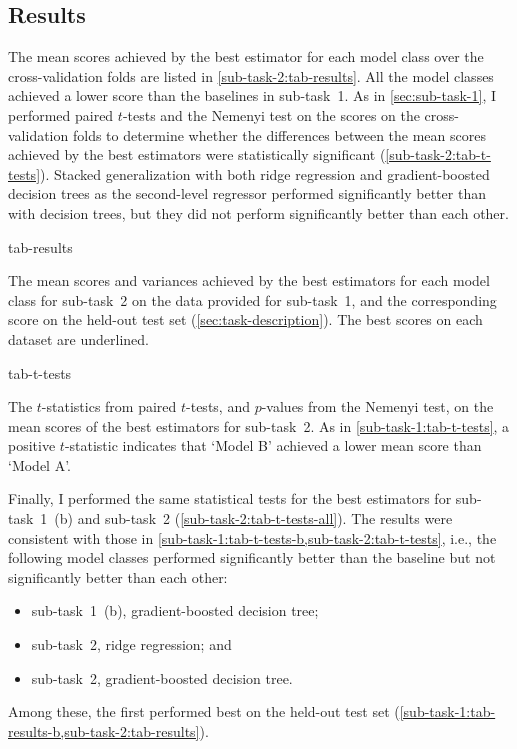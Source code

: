 \subsection{Results}
\label{sec:sub-task-2:results}

The mean scores achieved by the best estimator for each model class over the
cross-validation folds are listed in \cref{sub-task-2:tab-results}.
All the model classes achieved a lower score than the baselines in sub-task~1.
As in \cref{sec:sub-task-1}, I performed paired $t$-tests and the Nemenyi test on the
scores on the cross-validation folds to determine whether the differences between the
mean scores achieved by the best estimators were statistically significant
(\cref{sub-task-2:tab-t-tests}).
Stacked generalization with both ridge regression and gradient-boosted decision trees
as the second-level regressor performed significantly better than with decision trees,
but they did not perform significantly better than each other.

\begin{table}
  \centering
  {tab-results}
  \caption{
    The mean scores and variances achieved by the best estimators for each model class
    for sub-task~2 on the data provided for sub-task~1, and the corresponding score on
    the held-out test set (\cref{sec:task-description}).
    The best scores on each dataset are underlined.
  }
  \label{sub-task-2:tab-results}
\end{table}

\begin{table}
  \centering
  {tab-t-tests}
  \caption{
    The $t$-statistics from paired $t$-tests, and $p$-values from the Nemenyi test, on
    the mean scores of the best estimators for sub-task~2.
    As in \cref{sub-task-1:tab-t-tests}, a positive $t$-statistic indicates that `Model B'
    achieved a lower mean score than `Model A'.
  }
  \label{sub-task-2:tab-t-tests}
\end{table}

Finally, I performed the same statistical tests for the best estimators for
sub-task~1~(b) and sub-task~2 (\cref{sub-task-2:tab-t-tests-all}).
The results were consistent with those in
\cref{sub-task-1:tab-t-tests-b,sub-task-2:tab-t-tests}, i.e., the following model classes
performed significantly better than the baseline but not significantly better than
each other:
\begin{itemize}
  \item sub-task~1~(b), gradient-boosted decision tree;
  \item sub-task~2, ridge regression; and
  \item sub-task~2, gradient-boosted decision tree.
\end{itemize}
Among these, the first performed best on the held-out test set
(\cref{sub-task-1:tab-results-b,sub-task-2:tab-results}).

